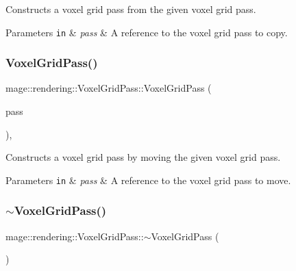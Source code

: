 Constructs a voxel grid pass from the given voxel grid pass.


\begin{DoxyParams}[1]{Parameters}
\mbox{\tt in}  & {\em pass} & A reference to the voxel grid pass to copy. \\
\hline
\end{DoxyParams}
\mbox{\label{classmage_1_1rendering_1_1_voxel_grid_pass_a08071670f68b888089b3f945c4ee2dc1}} 
\subsubsection{\texorpdfstring{Voxel\+Grid\+Pass()}{VoxelGridPass()}\hspace{0.1cm}{\footnotesize\ttfamily [3/3]}}
{\footnotesize\ttfamily mage\+::rendering\+::\+Voxel\+Grid\+Pass\+::\+Voxel\+Grid\+Pass (\begin{DoxyParamCaption}\item[{\mbox{\hyperlink{classmage_1_1rendering_1_1_voxel_grid_pass}{Voxel\+Grid\+Pass}} \&\&}]{pass }\end{DoxyParamCaption})\hspace{0.3cm}{\ttfamily [default]}, {\ttfamily [noexcept]}}

Constructs a voxel grid pass by moving the given voxel grid pass.


\begin{DoxyParams}[1]{Parameters}
\mbox{\tt in}  & {\em pass} & A reference to the voxel grid pass to move. \\
\hline
\end{DoxyParams}
\mbox{\label{classmage_1_1rendering_1_1_voxel_grid_pass_a64361ec102c8f3f30d1e0d8edac33e5a}} 
\subsubsection{\texorpdfstring{$\sim$\+Voxel\+Grid\+Pass()}{~VoxelGridPass()}}
{\footnotesize\ttfamily mage\+::rendering\+::\+Voxel\+Grid\+Pass\+::$\sim$\+Voxel\+Grid\+Pass (\begin{DoxyParamCaption}{ }\end{DoxyParamCaption})\hspace{0.3cm}{\ttfamily [default]}}

